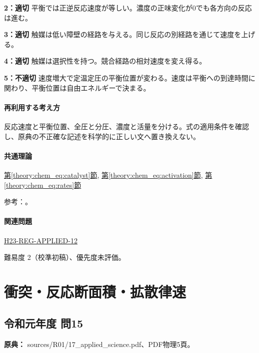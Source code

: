 \noindent\textbf{2：適切} 平衡では正逆反応速度が等しい。濃度の正味変化が0でも各方向の反応は進む。\par

\noindent\textbf{3：適切} 触媒は低い障壁の経路を与える。同じ反応の別経路を通じて速度を上げる。\par

\noindent\textbf{4：適切} 触媒は選択性を持つ。競合経路の相対速度を変え得る。\par

\noindent\textbf{5：不適切} 速度増大で定温定圧の平衡位置が変わる。速度は平衡への到達時間に関わり、平衡位置は自由エネルギーで決まる。\par

\paragraph{再利用する考え方} 反応速度と平衡位置、全圧と分圧、濃度と活量を分ける。式の適用条件を確認し、原典の不正確な記述を科学的に正しい文へ置き換えない。

\paragraph{共通理論} \hyperref[theory:chem_eq:catalyst]{第\ref*{theory:chem_eq:catalyst}節}, \hyperref[theory:chem_eq:activation]{第\ref*{theory:chem_eq:activation}節}, \hyperref[theory:chem_eq:rates]{第\ref*{theory:chem_eq:rates}節}

\par 参考：\cite{iupac_greenbook2012}。

\paragraph{関連問題} \hyperref[q:h23-reg-applied-12]{H23-REG-APPLIED-12}

\par 難易度 2（校準初稿）、優先度未評価。

\section{衝突・反応断面積・拡散律速}

\subsection{令和元年度 問15}
\label{q:r01-reg-applied-15}

\noindent\textbf{原典：} sources/R01/17\_applied\_science.pdf、PDF物理5頁。

